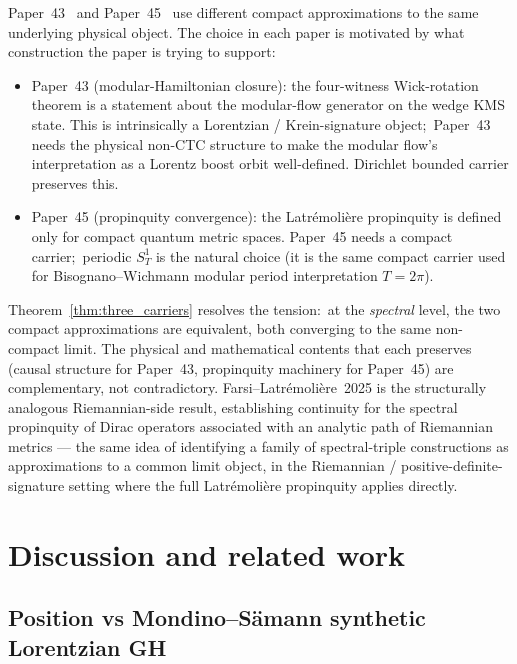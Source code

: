 \documentclass[11pt,a4paper]{article}
\theoremstyle{plain}
\theoremstyle{definition}
\newcommand{\SoneT}{S^{1}_{T}}
\begin{document}
Paper~43~\cite{paper43} and Paper~45~\cite{paper45} use different
compact approximations to the same underlying physical object. The
choice in each paper is motivated by what construction the paper is
trying to support:
\begin{itemize}
\item Paper~43 (modular-Hamiltonian closure): the four-witness
Wick-rotation theorem is a statement about the modular-flow generator
on the wedge KMS state. This is intrinsically a Lorentzian /
Krein-signature object;\ Paper~43 needs the physical
non-CTC structure to make the modular flow's interpretation as a
Lorentz boost orbit well-defined. Dirichlet bounded carrier
preserves this.
\item Paper~45 (propinquity convergence): the Latr\'emoli\`ere
propinquity is defined only for compact quantum metric spaces. Paper~45
needs a compact carrier;\ periodic $\SoneT$ is the natural choice (it
is the same compact carrier used for Bisognano--Wichmann modular
period interpretation $T = 2\pi$).
\end{itemize}

Theorem~\ref{thm:three_carriers} resolves the tension:\ at the
\emph{spectral} level, the two compact approximations are equivalent,
both converging to the same non-compact limit. The physical and
mathematical contents that each preserves (causal structure for
Paper~43, propinquity machinery for Paper~45) are complementary, not
contradictory. Farsi--Latr\'emoli\`ere~2025
\cite{farsi_latremoliere2025} is the structurally analogous
Riemannian-side result, establishing continuity for the spectral
propinquity of Dirac operators associated with an analytic path of
Riemannian metrics — the same idea of identifying a family of
spectral-triple constructions as approximations to a common limit
object, in the Riemannian / positive-definite-signature setting where
the full Latr\'emoli\`ere propinquity applies directly.

\section{Discussion and related work}\label{sec:discussion}

\subsection{Position vs Mondino--S\"amann synthetic Lorentzian GH}
\label{sec:vs_mondino_samann}
\end{document}
